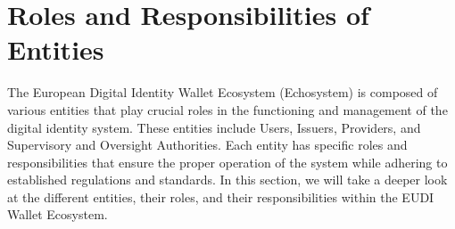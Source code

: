 \documentclass[sigconf,balance,nonacm,authordraft]{acmart}
\begin{document}
\section{Roles and Responsibilities of Entities}
\label{sec:roles}
The European Digital Identity Wallet Ecosystem (Echosystem) is composed of various entities that play crucial roles in the functioning and management of the digital identity system. These entities include Users, Issuers, Providers, and Supervisory and Oversight Authorities. 
Each entity has specific roles and responsibilities that ensure the proper operation of the system while adhering to established regulations and standards.
In this section, we will take a deeper look at the different entities, their roles, and their responsibilities within the EUDI Wallet Ecosystem.
\end{document}
